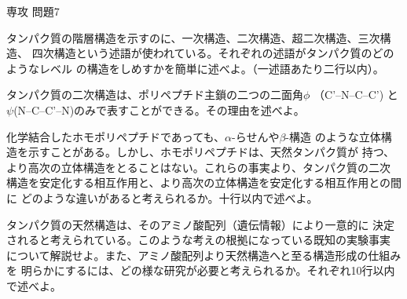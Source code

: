 \documentclass[fleqn]{jbook}
\begin{document}
\begin{question}{専攻 問題7}{}

\begin{subquestions}
\SubQuestion
タンパク質の階層構造を示すのに、一次構造、二次構造、超二次構造、三次構造、
四次構造という述語が使われている。それぞれの述語がタンパク質のどのようなレベル
の構造をしめすかを簡単に述べよ。（一述語あたり二行以内）。
\item タンパク質の二次構造は、ポリペプチド主鎖の二つの二面角$\phi$
（C'--N--C--C')
と$\psi$(N--C--C'--N)のみで表すことができる。その理由を述べよ。

\SubQuestion
化学結合したホモポリペプチドであっても、$\alpha$-らせんや$\beta$-構造
のような立体構造を示すことがある。しかし、ホモポリペプチドは、天然タンパク質が
持つ、より高次の立体構造をとることはない。これらの事実より、タンパク質の二次
構造を安定化する相互作用と、より高次の立体構造を安定化する相互作用との間に
どのような違いがあると考えられるか。十行以内で述べよ。
\item タンパク質の天然構造は、そのアミノ酸配列（遺伝情報）により一意的に
決定されると考えられている。このような考えの根拠になっている既知の実験事実
について解説せよ。また、アミノ酸配列より天然構造へと至る構造形成の仕組みを
明らかにするには、どの様な研究が必要と考えられるか。それぞれ10行以内で述べよ。

\end{subquestions}
\end{question}
\end{document}
